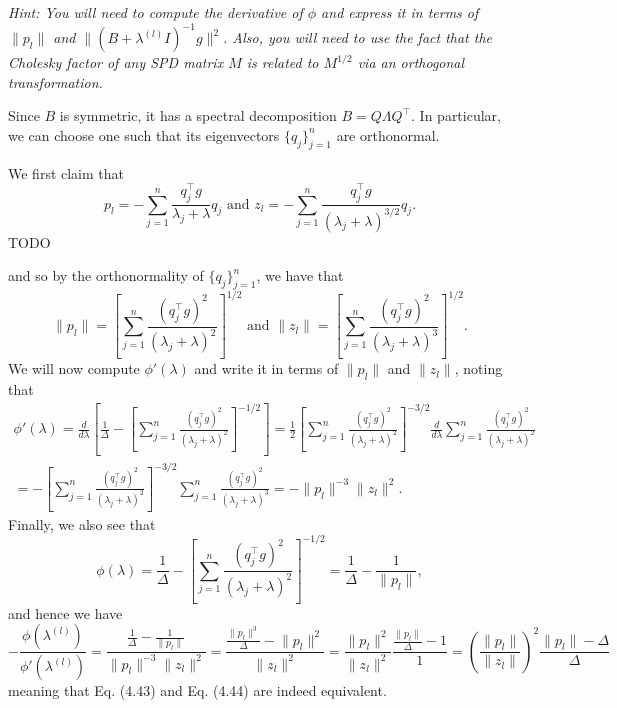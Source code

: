 \documentclass{../kin_math}
\begin{document}
\begin{questions}
  \emph{Hint: You will need to compute the derivative of $\phi$ and express it in terms of $\lVert p_l \rVert$ and $\lVert (B + \lambda^{(l)} I)^{-1} g \rVert^2$. Also, you will need to use the fact that the Cholesky factor of any SPD matrix $M$ is related to $M^{1 / 2}$ via an orthogonal transformation.}
  \begin{solution}
    Since $B$ is symmetric, it has a spectral decomposition $B = Q \Lambda Q^\top$. In particular, we can choose one such that its eigenvectors $\{q_j\}_{j = 1}^n$ are orthonormal.

    We first claim that
    \begin{equation*}
      p_l = -\sum_{j = 1}^n \frac{q_j^\top g}{\lambda_j + \lambda} q_j \text{ and } z_l = -\sum_{j = 1}^n \frac{q_j^\top g}{(\lambda_j + \lambda)^{3 / 2}} q_j.
    \end{equation*}
    TODO

    and so by the orthonormality of $\{q_j\}_{j = 1}^n$, we have that
    \begin{equation*}
      \lVert p_l \rVert = \left[\sum_{j = 1}^n \frac{(q_j^\top g)^2}{(\lambda_j + \lambda)^2}\right]^{1 / 2} \text{ and } \lVert z_l \rVert = \left[\sum_{j = 1}^n \frac{(q_j^\top g)^2}{(\lambda_j + \lambda)^3}\right]^{1 / 2}.
    \end{equation*}
    We will now compute $\phi'(\lambda)$ and write it in terms of $\lVert p_l \rVert$ and $\lVert z_l \rVert$, noting that
    \begin{multline*}
      \phi'(\lambda) = \frac{d}{d\lambda} \left[\frac{1}{\Delta} - \left[\sum_{j = 1}^n \frac{(q_j^\top g)^2}{(\lambda_j + \lambda)^2}\right]^{-1 / 2} \right] = \frac{1}{2} \left[\sum_{j = 1}^n \frac{(q_j^\top g)^2}{(\lambda_j + \lambda)^2}\right]^{-3 / 2} \frac{d}{d\lambda} \sum_{j = 1}^n \frac{(q_j^\top g)^2}{(\lambda_j + \lambda)^2} \\
      = -\left[\sum_{j = 1}^n \frac{(q_j^\top g)^2}{(\lambda_j + \lambda)^2}\right]^{-3 / 2} \sum_{j = 1}^n \frac{(q_j^\top g)^2}{(\lambda_j + \lambda)^3} = - \lVert p_l \rVert^{-3} \lVert z_l \rVert^2.
    \end{multline*}
    Finally, we also see that
    \begin{equation*}
      \phi(\lambda) = \frac{1}{\Delta} - \left[\sum_{j = 1}^n \frac{(q_j^\top g)^2}{(\lambda_j + \lambda)^2}\right]^{-1 / 2} = \frac{1}{\Delta} - \frac{1}{\lVert p_l \rVert},
    \end{equation*}
    and hence we have
    \begin{equation*}
      -\frac{\phi(\lambda^{(l)})}{\phi'(\lambda^{(l)})} = \dfrac{\frac{1}{\Delta} - \frac{1}{\lVert p_l \rVert}}{\lVert p_l \rVert^{-3} \lVert z_l \rVert^2} = \dfrac{\frac{\lVert p_l \rVert^{3}}{\Delta} - \lVert p_l \rVert^2}{\lVert z_l \rVert^2} = \dfrac{\lVert p_l \rVert^2}{\lVert z_l \rVert^2} \dfrac{\frac{\lVert p_l \rVert}{\Delta} - 1}{1} = \left(\frac{\lVert p_l \rVert}{\lVert z_l \rVert}\right)^2 \frac{\lVert p_l \rVert - \Delta}{\Delta}
    \end{equation*}
    meaning that Eq. (4.43) and Eq. (4.44) are indeed equivalent.
  \end{solution}


\end{questions}
\end{document}
